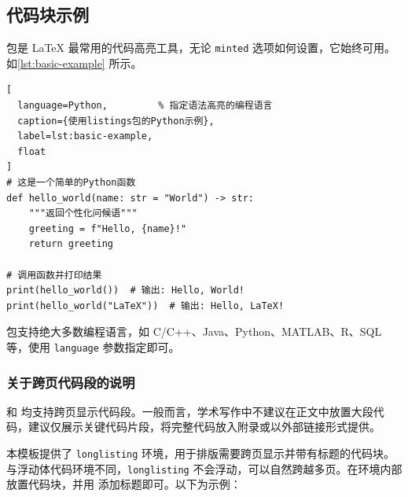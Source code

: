 \subsection{代码块示例}

 包是 \LaTeX{} 最常用的代码高亮工具，无论 \texttt{minted} 选项如何设置，它始终可用。如\cref{lst:basic-example} 所示。

\begin{lstlisting}[
  language=Python,         % 指定语法高亮的编程语言
  caption={使用listings包的Python示例},
  label=lst:basic-example,
  float
]
# 这是一个简单的Python函数
def hello_world(name: str = "World") -> str:
    """返回个性化问候语"""
    greeting = f"Hello, {name}!"
    return greeting

# 调用函数并打印结果
print(hello_world())  # 输出: Hello, World!
print(hello_world("LaTeX"))  # 输出: Hello, LaTeX!
\end{lstlisting}

 包支持绝大多数编程语言，如 C/C++、Java、Python、MATLAB、R、SQL 等，使用 \texttt{language} 参数指定即可。

\subsubsection{关于跨页代码段的说明}
 和  均支持跨页显示代码段。一般而言，学术写作中不建议在正文中放置大段代码，建议仅展示关键代码片段，将完整代码放入附录或以外部链接形式提供。

本模板提供了 \texttt{longlisting} 环境，用于排版需要跨页显示并带有标题的代码块。与浮动体代码环境不同，\texttt{longlisting} 不会浮动，可以自然跨越多页。在环境内部放置代码块，并用  添加标题即可。以下为示例：

